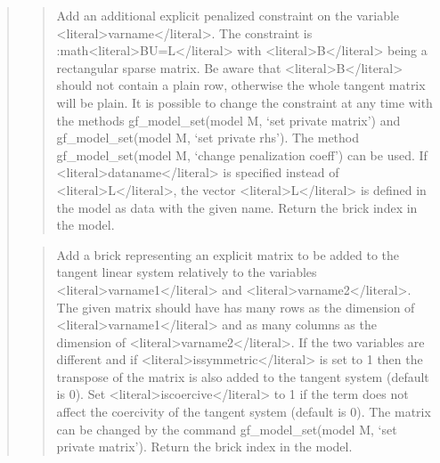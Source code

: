 \documentclass[a4paper,11pt,english]{sphinxmanual}
\begin{document}
\begin{quote}
\sphinxAtStartPar
{}
\begin{quote}

\sphinxAtStartPar
Add an additional explicit penalized constraint on the variable \textless{}literal\textgreater{}varname\textless{}/literal\textgreater{}.
The constraint is :math\textless{}literal\textgreater{}BU=L\textless{}/literal\textgreater{} with \textless{}literal\textgreater{}B\textless{}/literal\textgreater{} being a rectangular sparse matrix.
Be aware that \textless{}literal\textgreater{}B\textless{}/literal\textgreater{} should not contain a plain row, otherwise the whole
tangent matrix will be plain. It is possible to change the constraint
at any time with the methods gf\_model\_set(model M, ‘set private matrix’)
and gf\_model\_set(model M, ‘set private rhs’). The method
gf\_model\_set(model M, ‘change penalization coeff’) can be used.
If \textless{}literal\textgreater{}dataname\textless{}/literal\textgreater{} is specified instead of \textless{}literal\textgreater{}L\textless{}/literal\textgreater{}, the vector \textless{}literal\textgreater{}L\textless{}/literal\textgreater{} is defined
in the model as data with the given name.
Return the brick
index in the model.
\end{quote}

\sphinxAtStartPar
{}
\begin{quote}

\sphinxAtStartPar
Add a brick representing an explicit matrix to be added to the tangent
linear system relatively to the variables \textless{}literal\textgreater{}varname1\textless{}/literal\textgreater{} and \textless{}literal\textgreater{}varname2\textless{}/literal\textgreater{}.
The given matrix should have has many rows as the dimension of
\textless{}literal\textgreater{}varname1\textless{}/literal\textgreater{} and as many columns as the dimension of \textless{}literal\textgreater{}varname2\textless{}/literal\textgreater{}.
If the two variables are different and if \textless{}literal\textgreater{}issymmetric\textless{}/literal\textgreater{} is set to 1
then the transpose of the matrix is also added to the tangent system
(default is 0). Set \textless{}literal\textgreater{}iscoercive\textless{}/literal\textgreater{} to 1 if the term does not affect the
coercivity of the tangent system (default is 0). The matrix can be
changed by the command gf\_model\_set(model M, ‘set private matrix’). Return the
brick index in the model.
\end{quote}


\end{quote}
\end{document}
